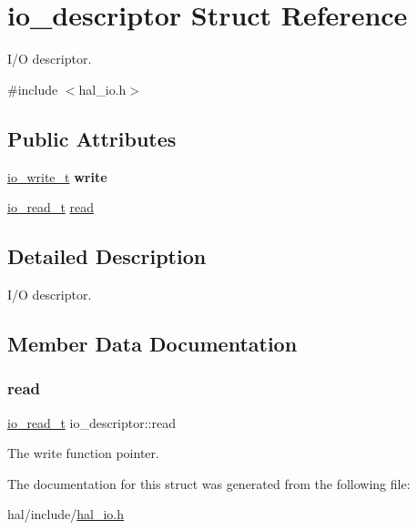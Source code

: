 \hypertarget{structio__descriptor}{}\section{io\+\_\+descriptor Struct Reference}
\label{structio__descriptor}


I/O descriptor.  




{\ttfamily \#include $<$hal\+\_\+io.\+h$>$}

\subsection*{Public Attributes}
\begin{DoxyCompactItemize}
\item 
\mbox{\label{structio__descriptor_a962235264b6c73e3ab712acb64022194}} 
\hyperlink{group__doc__driver__hal__helper__io_gacb03c48993a6786f00946c196c40add1}{io\+\_\+write\+\_\+t} {\bfseries write}
\item 
\hyperlink{group__doc__driver__hal__helper__io_ga4d9ae58de2887289fe09eac6f0aa8be7}{io\+\_\+read\+\_\+t} \hyperlink{structio__descriptor_a8ad97905c11dc07cd30373afc0fc146f}{read}
\end{DoxyCompactItemize}


\subsection{Detailed Description}
I/O descriptor. 

\subsection{Member Data Documentation}
\mbox{\label{structio__descriptor_a8ad97905c11dc07cd30373afc0fc146f}} 
\subsubsection{\texorpdfstring{read}{read}}
{\footnotesize\ttfamily \hyperlink{group__doc__driver__hal__helper__io_ga4d9ae58de2887289fe09eac6f0aa8be7}{io\+\_\+read\+\_\+t} io\+\_\+descriptor\+::read}

The write function pointer. 

The documentation for this struct was generated from the following file\+:\begin{DoxyCompactItemize}
\item 
hal/include/\hyperlink{hal__io_8h}{hal\+\_\+io.\+h}\end{DoxyCompactItemize}
